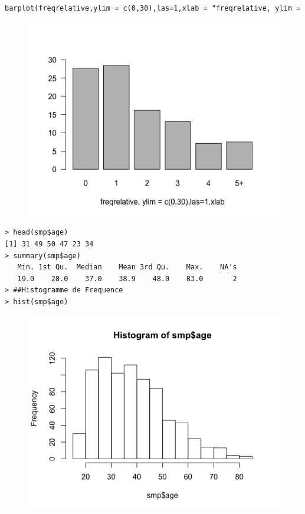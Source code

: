 \begin{lstlisting}[language=html]
barplot(freqrelative,ylim = c(0,30),las=1,xlab = "freqrelative, ylim = c(0,30),las=1,xlab")
\end{lstlisting}
\begin{figure}[H]\begin{center}\includegraphics[scale=0.45]{ilu/lab2-3.png}\end{center}\end{figure}

\begin{lstlisting}[language=html]
> head(smp$age)
[1] 31 49 50 47 23 34
> summary(smp$age)
   Min. 1st Qu.  Median    Mean 3rd Qu.    Max.    NA's 
   19.0    28.0    37.0    38.9    48.0    83.0       2 
> ##Histogramme de Frequence
> hist(smp$age)
\end{lstlisting}

\begin{figure}[H]\begin{center}\includegraphics[scale=0.45]{ilu/lab2-4.png}\end{center}\end{figure}

